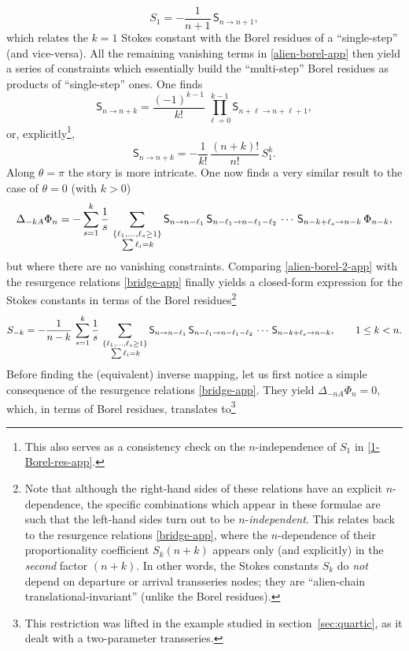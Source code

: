 \documentclass[11pt,a4paper]{article}
\newcommand{\be}{\begin{equation}}
\newcommand{\ee}{\end{equation}}
\begin{document}
%
\be
\label{1-Borel-res-app}
S_1 = - \frac{1}{n+1}\, \mathsf{S}_{n\to n+1},
\ee
%
\noindent
which relates the $k=1$ Stokes constant with the Borel residues of a ``single-step'' (and vice-versa). All the remaining vanishing terms in \eqref{alien-borel-app} then yield a series of constraints which essentially build the ``multi-step'' Borel residues as products of ``single-step'' ones. One finds
%
\be
\mathsf{S}_{n\to n+k} = \frac{(-1)^{k-1}}{k!}\, \prod_{\ell=0}^{k-1} \mathsf{S}_{n+\ell\to n+\ell+1},
\ee
%
\noindent
or, explicitly\footnote{This also serves as a consistency check on the $n$-independence of $S_1$ in \eqref{1-Borel-res-app}.},
%
\be
\mathsf{S}_{n\to n+k} = - \frac{1}{k!}\, \frac{(n+k)!}{n!}\, S_1^k.
\ee
%
\noindent
Along $\theta=\pi$ the story is more intricate. One now finds a very similar result to the case of $\theta=0$ (with $k>0$)
%
\be
\label{alien-borel-2-app}
\Delta_{-kA} \Phi_n = - \sum_{s=1}^{k} \frac{1}{s}\, \sum_{\substack{\left\{ \ell_1,\ldots,\ell_s\ge 1 \right\} \\ \vphantom{\frac{1}{2}} \sum \ell_i=k}} \mathsf{S}_{n\to n-\ell_1}\, \mathsf{S}_{n-\ell_1\to n-\ell_1-\ell_2}\, \cdots\, \mathsf{S}_{n-k+\ell_s\to n-k}\, \Phi_{n-k},
\ee
%
\noindent
but where there are no vanishing constraints. Comparing \eqref{alien-borel-2-app} with the resurgence relations \eqref{bridge-app} finally yields a closed-form expression for the Stokes constants in terms of the Borel residues\footnote{Note that although the right-hand sides of these relations have an explicit $n$-dependence, the specific combinations which appear in these formulae are such that the left-hand sides turn out to be $n$-\textit{independent}. This relates back to the resurgence relations \eqref{bridge-app}, where the $n$-dependence of their proportionality coefficient $S_k \left( n+k \right)$ appears only (and explicitly) in the \textit{second} factor $\left( n+k \right)$. In other words, the Stokes constants $S_k$ do \textit{not} depend on departure or arrival transseries nodes; they are ``alien-chain translational-invariant'' (unlike the Borel residues).} \cite{s07}
%
\be
\label{neg-Borel-res-app}
S_{-k} = - \frac{1}{n-k}\, \sum_{s=1}^{k} \frac{1}{s}\, \sum_{\substack{\left\{ \ell_1,\ldots,\ell_s\ge 1 \right\} \\ \vphantom{\frac{1}{2}} \sum \ell_i=k}} \mathsf{S}_{n\to n-\ell_1}\, \mathsf{S}_{n-\ell_1\to n-\ell_1-\ell_2}\, \cdots\, \mathsf{S}_{n-k+\ell_s\to n-k}, \qquad 1\le k < n.
\ee
%
\noindent
Before finding the (equivalent) inverse mapping, let us first notice a simple consequence of the resurgence relations \eqref{bridge-app}. They yield $\Delta_{-nA}\Phi_n=0$, which, in terms of Borel residues, translates to\footnote{This restriction was lifted in the example studied in section~\ref{sec:quartic}, as it dealt with a two-parameter transseries.}
\end{document}
